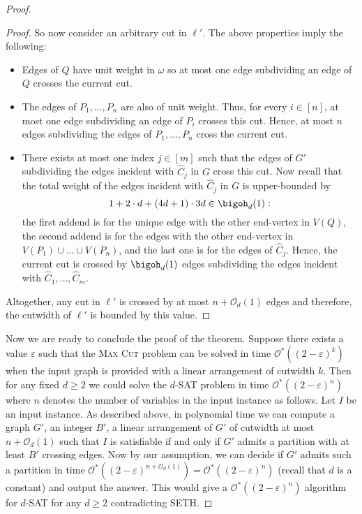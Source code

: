 \documentclass[a4paper,UKenglish,cleveref, autoref, thm-restate]{lipics-v2021}
\begin{document}
\begin{proof}
\begin{proof}
        So now consider an arbitrary cut in $\ell'$.
        The above properties imply the following:
        \begin{itemize}
            \item Edges of $Q$ have unit weight in $\omega$ so at most one edge subdividing an edge of $Q$ crosses the current cut.
            \item The edges of $P_1, \dots, P_n$ are also of unit weight.
            Thus, for every $i \in [n]$, at most one edge subdividing an edge of $P_i$ crosses this cut. Hence, at most $n$ edges subdividing the edges of $P_1, \dots, P_n$ cross the current cut.
            \item There exists at most one index $j \in [m]$ such that the edges of $G'$ subdividing the edges incident with $\hat C_j$ in $G$ cross this cut.
            Now recall that the total weight of the edges incident with $\hat C_j$ in $G$ is upper-bounded by 
            \[
                1 + 2 \cdot d + (4d + 1) \cdot 3 d \in \bigoh_d(1): 
            \]
            the first addend is for the unique edge with the other end-vertex in $V(Q)$, the second addend is for the edges with the other end-vertex in $V(P_1) \cup \dots \cup V(P_n)$, and the last one is for the edges of $\hat C_j$.
            Hence, the current cut is crossed by $\bigoh_d(1)$ edges subdividing the edges incident with $\hat C_1, \dots, \hat C_m$.
        \end{itemize}
        Altogether, any cut in $\ell'$ is crossed by at most $n + \mathcal{O}_d(1)$ edges and therefore, the cutwidth of $\ell'$ is bounded by this value.
        \end{proof}

    Now we are ready to conclude the proof of the theorem.
    Suppose there exists a value $\varepsilon$ such that the \textsc{Max Cut} problem can be solved in time $\mathcal{O}^*((2-\varepsilon)^k)$ when the input graph is provided with a linear arrangement of cutwidth $k$.
    Then for any fixed $d \geq 2$ we could solve the \textsc{$d$-SAT} problem in time $\mathcal{O}^*((2-\varepsilon)^n)$ where $n$ denotes the number of variables in the input instance as follows.
    Let $I$ be an input instance.
    As described above, in polynomial time we can compute a graph $G'$, an integer $B'$, a linear arrangement of $G'$ of cutwidth at most $n+\mathcal{O}_d(1)$ such that $I$ is satisfiable if and only if $G'$ admits a partition with at least $B'$ crossing edges.
    Now by our assumption, we can decide if $G'$ admits such a partition in time $\mathcal{O}^*((2-\varepsilon)^{n+\mathcal{O}_d(1)}) = \mathcal{O}^*((2-\varepsilon)^{n})$ (recall that $d$ is a constant) and output the answer.
    This would give a $\mathcal{O}^*((2-\varepsilon)^n)$ algorithm for \textsc{$d$-SAT} for any $d \geq 2$ contradicting SETH.
\end{proof}
 
\end{document}
